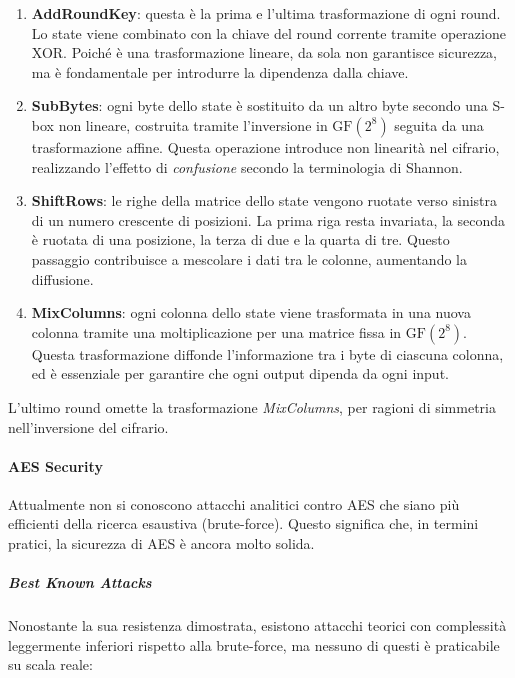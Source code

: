\documentclass{report}
\begin{document}
\begin{enumerate}
    \item \textbf{AddRoundKey}: questa è la prima e l'ultima trasformazione di ogni round. Lo state viene combinato con la chiave del round corrente tramite operazione XOR. Poiché è una trasformazione lineare, da sola non garantisce sicurezza, ma è fondamentale per introdurre la dipendenza dalla chiave.
    
    \item \textbf{SubBytes}: ogni byte dello state è sostituito da un altro byte secondo una S-box non lineare, costruita tramite l'inversione in $\text{GF}(2^8)$ seguita da una trasformazione affine. Questa operazione introduce non linearità nel cifrario, realizzando l'effetto di \textit{confusione} secondo la terminologia di Shannon.

    \item \textbf{ShiftRows}: le righe della matrice dello state vengono ruotate verso sinistra di un numero crescente di posizioni. La prima riga resta invariata, la seconda è ruotata di una posizione, la terza di due e la quarta di tre. Questo passaggio contribuisce a mescolare i dati tra le colonne, aumentando la diffusione.

    \item \textbf{MixColumns}: ogni colonna dello state viene trasformata in una nuova colonna tramite una moltiplicazione per una matrice fissa in $\text{GF}(2^8)$. Questa trasformazione diffonde l'informazione tra i byte di ciascuna colonna, ed è essenziale per garantire che ogni output dipenda da ogni input.
\end{enumerate}

L’ultimo round omette la trasformazione \textit{MixColumns}, per ragioni di simmetria nell’inversione del cifrario.



\paragraph{AES Security}

Attualmente non si conoscono attacchi analitici contro AES che siano più efficienti della ricerca esaustiva (brute-force). Questo significa che, in termini pratici, la sicurezza di AES è ancora molto solida.

\subparagraph{Best Known Attacks}

Nonostante la sua resistenza dimostrata, esistono attacchi teorici con complessità leggermente inferiori rispetto alla brute-force, ma nessuno di questi è praticabile su scala reale:
\end{document}
